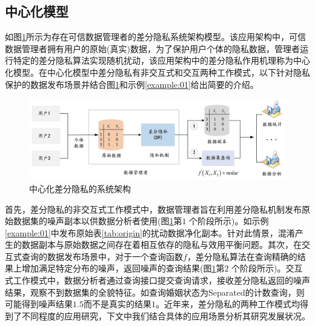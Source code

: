 \subsection{中心化模型}
如图\ref{fig:chapter02-dp-model}所示为存在可信数据管理者的差分隐私系统架构模型。该应用架构中，可信数据管理者拥有用户的原始(真实)数据，为了保护用户个体的隐私数据，管理者运行特定的差分隐私算法实现随机扰动，该应用架构中的差分隐私作用机理称为中心化模型。在中心化模型中差分隐私有非交互式和交互两种工作模式\cite{dwork2014algorithmic}，以下针对隐私保护的数据发布场景并结合图\ref{fig:chapter02-dp-model}和示例\ref{example:01}给出简要的介绍。

\begin{figure}[htbp]
	\centering
	\includegraphics[width = 0.85\linewidth]{./figures/chapter02_1.jpg}
	\caption{中心化差分隐私的系统架构}
	\label{fig:chapter02-dp-model}
\end{figure}

首先，差分隐私的非交互式工作模式中，数据管理者旨在利用差分隐私机制发布原始数据集的噪声副本以供数据分析者使用(图\ref{fig:chapter02-dp-model}第$1$ 个阶段所示)。如示例\ref{example:01}中发布原始表\ref{tab:origin}的扰动数据净化副本。针对此情景，混淆产生的数据副本与原始数据之间存在着相互依存的隐私与效用平衡问题。其次，在交互式查询的数据发布场景中，对于一个查询函数$f$，差分隐私算法在查询精确的结果上增加满足特定分布的噪声，返回噪声的查询结果(图\ref{fig:chapter02-dp-model}第$2$ 个阶段所示)。交互式工作模式中，数据分析者通过查询接口提交查询请求，接收差分隐私返回的噪声结果，观察不到数据集的全貌特征。如查询婚姻状态为Separated的计数查询，则可能得到噪声结果$1.5$而不是真实的结果$1$。近年来，差分隐私的两种工作模式均得到了不同程度的应用研究，下文中我们结合具体的应用场景分析其研究发展状况。


